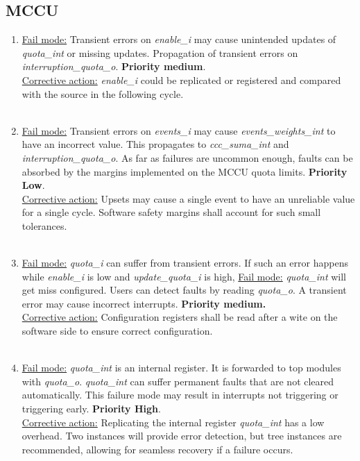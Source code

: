 \subsection{MCCU}
\begin{enumerate}
\item \underline{Fail mode:} Transient errors on\textit{ enable\_i} may cause unintended updates of \textit{quota\_int} or missing updates. Propagation of transient errors on \textit{interruption\_quota\_o}. \textbf{Priority medium}.\\
\underline{Corrective action:} \textit{ enable\_i} could be replicated or registered and compared with the source in the following cycle.\\
\\
\item \underline{Fail mode:} Transient errors on \textit{events\_i} may cause \textit{events\_weights\_int} to have an incorrect value. This propagates to \textit{ccc\_suma\_int} and \textit{interruption\_quota\_o}. As far as failures are uncommon enough, faults can be absorbed by the margins implemented on the MCCU quota limits. \textbf{Priority Low}.\\
\underline{Corrective action:} Upsets may cause a single event to have an unreliable value for a single cycle. Software safety margins shall account for such small tolerances.\\
\\
\item \underline{Fail mode:} \textit{quota\_i} can suffer from transient errors. If such an error happens while \textit{enable\_i} is low and \textit{update\_quota\_i} is high, \underline{Fail mode:} \textit{quota\_int} will get miss configured. Users can detect faults by reading \textit{quota\_o}. A transient error may cause incorrect interrupts.\textbf{ Priority medium. }\\
\underline{Corrective action:} Configuration registers shall be read after a wite on the software side to ensure correct configuration. \\
\\
\item \underline{Fail mode:} \textit{quota\_int} is an internal register. It is forwarded to top modules with \textit{quota\_o}. \textit{quota\_int} can suffer permanent faults that are not cleared automatically. This failure mode may result in interrupts not triggering or triggering early. \textbf{Priority High}.\\
\underline{Corrective action:}  Replicating the internal register  \textit{quota\_int} has a low overhead. Two instances will provide error detection, but tree instances are recommended, allowing for seamless recovery if a failure occurs.\\

\end{enumerate}
